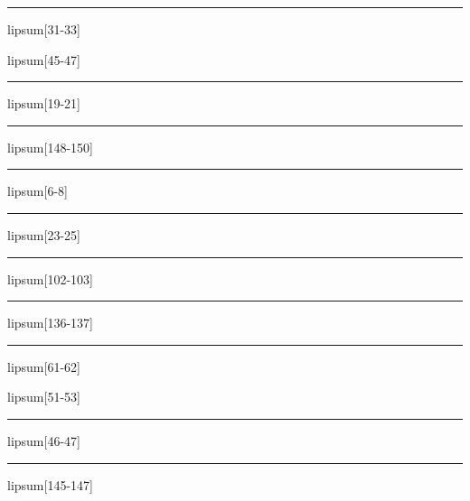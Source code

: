 \documentclass[11pt,a4paper]{article}
\begin{document}
\begin{simplewrap}
  \textcolor{yellow!59}{\rule{3.4cm}{4.0cm}}
\end{simplewrap}
lipsum[31-33]

lipsum[45-47]

\begin{simplewrap}
  \textcolor{purple!34}{\rule{4.6cm}{3.8cm}}
\end{simplewrap}
lipsum[19-21]

\begin{simplewrap}
  \textcolor{blue!37}{\rule{3.1cm}{9.4cm}}
\end{simplewrap}
lipsum[148-150]

\begin{simplewrap}
  \textcolor{pink!55}{\rule{4.9cm}{4.3cm}}
\end{simplewrap}
lipsum[6-8]

\begin{simplewrap}
  \textcolor{cyan!49}{\rule{4.4cm}{7.5cm}}
\end{simplewrap}
lipsum[23-25]

\begin{simplewrap}
  \textcolor{orange!25}{\rule{4.3cm}{5.2cm}}
\end{simplewrap}
lipsum[102-103]

\begin{simplewrap}
  \textcolor{brown!24}{\rule{4.0cm}{3.3cm}}
\end{simplewrap}
lipsum[136-137]

\begin{simplewrap}
  \textcolor{lime!32}{\rule{5.2cm}{8.6cm}}
\end{simplewrap}
lipsum[61-62]

lipsum[51-53]

\begin{simplewrap}
  \textcolor{cyan!48}{\rule{3.5cm}{8.1cm}}
\end{simplewrap}
lipsum[46-47]

\begin{simplewrap}
  \textcolor{red!39}{\rule{5.3cm}{8.1cm}}
\end{simplewrap}
lipsum[145-147]
\end{document}
